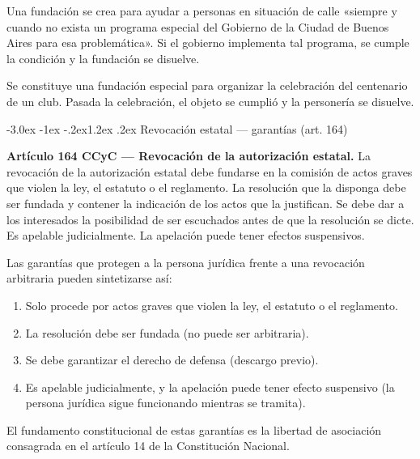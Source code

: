 \documentclass[12pt,oneside]{book}
\makeatletter
\renewcommand\section{\@startsection{section}{1}{\z@}%
  {-3.0ex \@plus -1ex \@minus -.2ex}{1.2ex \@plus .2ex}%
  {\normalfont\large\bfseries\color{acento}}}
\makeatother
\begin{document}
\begin{ejemplo}
Una fundación se crea para ayudar a personas en situación de calle «siempre y cuando no exista un programa especial del Gobierno de la Ciudad de Buenos Aires para esa problemática». Si el gobierno implementa tal programa, se cumple la condición y la fundación se disuelve.
\end{ejemplo}

\begin{ejemplo}
Se constituye una fundación especial para organizar la celebración del centenario de un club. Pasada la celebración, el objeto se cumplió y la personería se disuelve.
\end{ejemplo}

\section{Revocación estatal --- garantías (art. 164)}

\begin{importante}
\textbf{Artículo 164 CCyC --- Revocación de la autorización estatal.} La revocación de la autorización estatal debe fundarse en la comisión de actos graves que violen la ley, el estatuto o el reglamento. La resolución que la disponga debe ser fundada y contener la indicación de los actos que la justifican. Se debe dar a los interesados la posibilidad de ser escuchados antes de que la resolución se dicte. Es apelable judicialmente. La apelación puede tener efectos suspensivos.
\end{importante}

Las garantías que protegen a la persona jurídica frente a una revocación arbitraria pueden sintetizarse así:

\begin{enumerate}
    \item Solo procede por actos graves que violen la ley, el estatuto o el reglamento.
    \item La resolución debe ser fundada (no puede ser arbitraria).
    \item Se debe garantizar el derecho de defensa (descargo previo).
    \item Es apelable judicialmente, y la apelación puede tener efecto suspensivo (la persona jurídica sigue funcionando mientras se tramita).
\end{enumerate}

El fundamento constitucional de estas garantías es la libertad de asociación consagrada en el artículo 14 de la Constitución Nacional.
\end{document}
